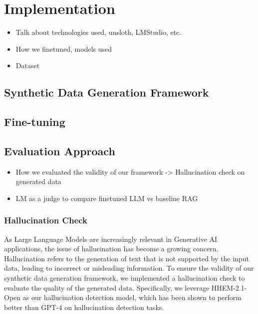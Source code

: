 \section{Implementation}


\begin{itemize}
    \item Talk about technologies used, unsloth, LMStudio, etc. 
    \item How we finetuned, models used
    \item Dataset
\end{itemize}

\subsection{Synthetic Data Generation Framework}


\subsection{Fine-tuning}

\subsection{Evaluation Approach}
\begin{itemize}
\item How we evaluated the validity of our framework -> Hallucination check on generated data 
\item LM as a judge to compare finetuned LLM vs baseline RAG
\end{itemize}

\subsubsection{Hallucination Check}

As Large Language Models are increasingly relevant in Generative AI applications, the issue of hallucination has become a growing concern.
Hallucination refers to the generation of text that is not supported by the input data, leading to incorrect or misleading information. 
To ensure the validity of our synthetic data generation framework, we implemented a hallucination check to evaluate the quality of the generated data.
Specifically, we leverage HHEM-2.1-Open %
as our hallucination detection model, which has been shown to perform better than GPT-4 on hallucination detection tasks. 

